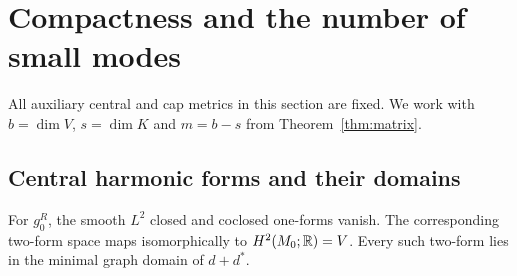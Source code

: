 \section{Compactness and the number of small modes}\label{sec:lower}

All auxiliary central and cap metrics in this section are fixed. We work
with $b=\dim V$, $s=\dim K$ and $m=b-s$ from Theorem~\ref{thm:matrix}.

\subsection{Central harmonic forms and their domains}
\begin{lemma}\label{lem:central-kernels}
For $g_0^R$, the smooth $L^2$ closed and coclosed one-forms vanish.
The corresponding two-form space maps isomorphically to
$H^2(M_0;\mathbb R)=V$. Every such two-form lies in the
minimal graph domain of $d+d^*$.
\end{lemma}
